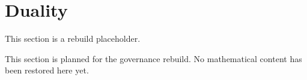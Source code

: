 \section{Duality}

\begin{tcolorbox}[colback=gray!6, colframe=gray!40, arc=2pt,
  left=6pt, right=6pt, top=4pt, bottom=4pt,
  title={\small\textbf{Duality Toolkit - Planned}},
  fonttitle=\small\bfseries]
This section is a rebuild placeholder.
\end{tcolorbox}

This section is planned for the governance rebuild. No mathematical content has
been restored here yet.
